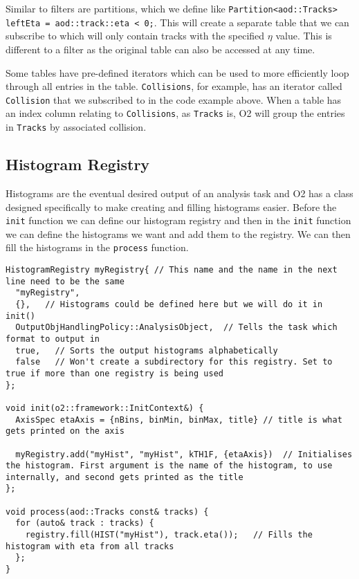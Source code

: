 Similar to filters are partitions, which we define like \texttt{Partition<aod::Tracks> leftEta = aod::track::eta < 0;}. This will create a separate table that we can subscribe to which will only contain tracks with the specified $\eta$ value. This is different to a filter as the original table can also be accessed at any time. 

Some tables have pre-defined iterators which can be used to more efficiently loop through all entries in the table. \texttt{Collisions}, for example, has an iterator called \texttt{Collision} that we subscribed to in the code example above. When a table has an index column relating to \texttt{Collisions}, as \texttt{Tracks} is, O2 will group the entries in \texttt{Tracks} by associated collision. 

\subsection{Histogram Registry}
Histograms are the eventual desired output of an analysis task and O2 has a class designed specifically to make creating and filling histograms easier. Before the \texttt{init} function we can define our histogram registry and then in the \texttt{init} function we can define the histograms we want and add them to the registry. We can then fill the histograms in the \texttt{process} function.

\begin{verbatim}
HistogramRegistry myRegistry{ // This name and the name in the next line need to be the same
  "myRegistry",
  {},   // Histograms could be defined here but we will do it in init()
  OutputObjHandlingPolicy::AnalysisObject,  // Tells the task which format to output in
  true,   // Sorts the output histograms alphabetically
  false   // Won't create a subdirectory for this registry. Set to true if more than one registry is being used
};

void init(o2::framework::InitContext&) {
  AxisSpec etaAxis = {nBins, binMin, binMax, title} // title is what gets printed on the axis

  myRegistry.add("myHist", "myHist", kTH1F, {etaAxis})  // Initialises the histogram. First argument is the name of the histogram, to use internally, and second gets printed as the title
};

void process(aod::Tracks const& tracks) {
  for (auto& track : tracks) {
    registry.fill(HIST("myHist"), track.eta());   // Fills the histogram with eta from all tracks
  };
}
\end{verbatim}

